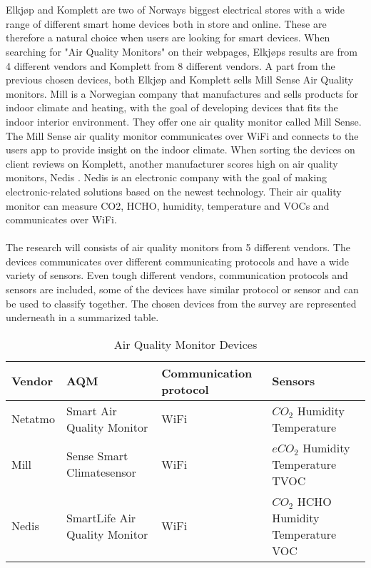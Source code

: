 \\\\
Elkjøp \cite{Elkjøp} and Komplett \cite{Komplett} are two of Norways biggest electrical stores with a wide range of different smart home devices both in store and online. These are therefore a natural choice when users are looking for smart devices. When searching for "Air Quality Monitors" on their webpages, Elkjøps results are from 4 different vendors and Komplett from 8 different vendors. A part from the previous chosen devices, both Elkjøp and Komplett sells Mill Sense Air Quality monitors. Mill \cite{Mill} is a Norwegian company that manufactures and sells products for indoor climate and heating, with the goal of developing devices that fits the indoor interior environment. They offer one air quality monitor called Mill Sense. The Mill Sense air quality monitor communicates over WiFi and connects to the users app to provide insight on the indoor climate. When sorting the devices on client reviews on Komplett, another manufacturer scores high on air quality monitors, Nedis \cite{Komplett}. Nedis \cite{Nedis} is an electronic company with the goal of making electronic-related solutions based on the newest technology. Their air quality monitor can measure CO2, HCHO, humidity, temperature and VOCs and communicates over WiFi. 
\\\\
The research will consists of air quality monitors from 5 different vendors. The devices communicates over different communicating protocols and have a wide variety of sensors. Even tough different vendors, communication protocols and sensors are included, some of the devices have similar protocol or sensor and can be used to classify together. The chosen devices from the survey are represented underneath in a summarized table. 
\begin{table}[!hbtp]
    \centering
    \begin{adjustbox}{width=1\textwidth}
    \begin{tabular}{| p{3cm} | p{5cm} | p{5cm} | p{3cm} |} 
        \hline
        \textbf{Vendor} & \textbf{AQM} & \textbf{Communication protocol} & \textbf{Sensors} \\
        \hline
        Netatmo & Smart Air Quality Monitor & WiFi & \(CO_2\) \newline Humidity \newline Temperature \\
        \hline
        Mill & Sense Smart Climatesensor & WiFi & \(eCO_2\) \newline Humidity \newline Temperature \newline TVOC \\
        \hline
        Nedis & SmartLife Air Quality Monitor & WiFi & \(CO_2\) \newline HCHO \newline Humidity \newline Temperature \newline VOC \\
        \hline
    \end{tabular}
    \end{adjustbox}
    \caption{Air Quality Monitor Devices}
    \label{tab:AQMSurvey}
\end{table}
